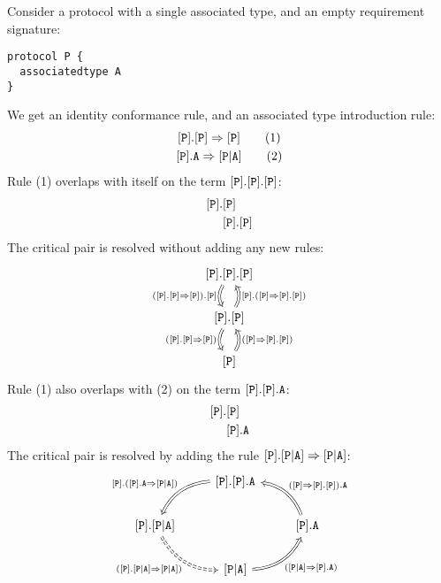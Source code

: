 \documentclass[../generics]{subfiles}
\begin{document}
\begin{example}\label{proto assoc rule}
Consider a protocol with a single associated type, and an empty requirement signature:
\begin{Verbatim}
protocol P {
  associatedtype A
}
\end{Verbatim}
We get an identity conformance rule, and an associated type introduction rule:
\begin{gather*}
\protosym{P}.\protosym{P}\Rightarrow\protosym{P}\tag{1}\\
\protosym{P}.\texttt{A}\Rightarrow\assocsym{P}{A}\tag{2}
\end{gather*}
Rule (1) overlaps with itself on the term $[\texttt{P}].[\texttt{P}].[\texttt{P}]$:
\begin{align*}
[\texttt{P}].&[\texttt{P}]\\
&[\texttt{P}].[\texttt{P}]
\end{align*}
The critical pair is resolved without adding any new rules:
\[
\begin{tikzcd}
\protosym{P}.\protosym{P}.\protosym{P}\arrow[d, Rightarrow, "(\ProtoInherit{P}{P}).\protosym{P}"', bend right]\\
\protosym{P}.\protosym{P}\arrow[d, Rightarrow, "(\ProtoInherit{P}{P})"', bend right]
\arrow[u, Rightarrow, "\protosym{P}.(\ProtoInheritInv{P}{P})"', bend right]\\
\protosym{P}\arrow[u, Rightarrow, "(\ProtoInheritInv{P}{P})"', bend right]
\end{tikzcd}
\]
Rule (1) also overlaps with (2) on the term $[\texttt{P}].[\texttt{P}].\texttt{A}$:
\begin{align*}
[\texttt{P}].&[\texttt{P}]\\
&[\texttt{P}].\texttt{A}
\end{align*}
The critical pair is resolved by adding the rule $[\texttt{P}].[\texttt{P}|\texttt{A}]\Rightarrow[\texttt{P}|\texttt{A}]$:
\[
\FourLoopDerived%
{\protosym{P}.\protosym{P}.\texttt{A}}%
{\protosym{P}.\assocsym{P}{A}}%
{\assocsym{P}{A}}%
{\protosym{P}.\texttt{A}}%
{\protosym{P}.(\AssocIntro{P}{A})}%
{(\protosym{P}.\assocsym{P}{A}\Rightarrow\assocsym{P}{A})}%
{(\AssocIntroInv{P}{A})}%
{(\ProtoInheritInv{P}{P}).\texttt{A}}
\]
\end{example}
\end{document}
